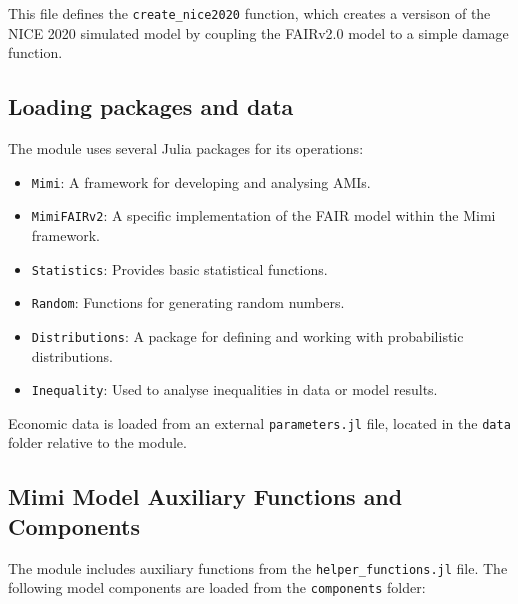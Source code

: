 \documentclass[
]{article}
\providecommand{\tightlist}{%
  \setlength{\itemsep}{0pt}\setlength{\parskip}{0pt}}
\begin{document}
This file defines the \texttt{create\_nice2020} function, which creates
a versison of the NICE 2020 simulated model by coupling the FAIRv2.0
model to a simple damage function.

\subsection{Loading packages and data}\label{loading-packages-and-data}

The module uses several Julia packages for its operations:

\begin{itemize}
\tightlist
\item
  \texttt{Mimi}: A framework for developing and analysing AMIs.
\item
  \texttt{MimiFAIRv2}: A specific implementation of the FAIR model
  within the Mimi framework.
\item
  \texttt{Statistics}: Provides basic statistical functions.
\item
  \texttt{Random}: Functions for generating random numbers.
\item
  \texttt{Distributions}: A package for defining and working with
  probabilistic distributions.
\item
  \texttt{Inequality}: Used to analyse inequalities in data or model
  results.
\end{itemize}

Economic data is loaded from an external \texttt{parameters.jl} file,
located in the \texttt{data} folder relative to the module.

\subsection{Mimi Model Auxiliary Functions and
Components}\label{mimi-model-auxiliary-functions-and-components}

The module includes auxiliary functions from the
\texttt{helper\_functions.jl} file. The following model components are
loaded from the \texttt{components} folder:
\end{document}
